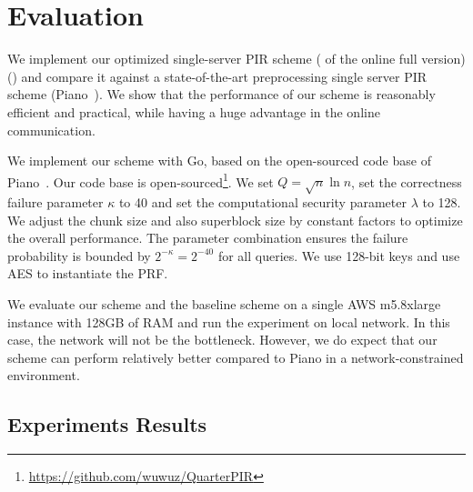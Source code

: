 

\section{Evaluation} 
\label{sec:evaluation}

We implement our optimized single-server PIR scheme 
\ifnum{}
( of the online full version)
\else
()
\fi
and compare it against a state-of-the-art preprocessing single server PIR scheme (Piano~\cite{piano}). 
We show that the performance of our scheme is reasonably efficient and practical, %
while having a huge advantage in the online communication. %

We implement our scheme with Go, based on the open-sourced code base of Piano~\cite{piano}.
Our code base is open-sourced\footnote{\url{https://github.com/wuwuz/QuarterPIR}}.
We set $Q=\sqrt{n}\ln n$, set the correctness failure parameter $\kappa$ to 40 and set the computational security parameter $\lambda$ to 128.
We adjust the chunk size and also superblock size by constant factors to optimize the overall performance.
The parameter combination ensures the failure probability is bounded by $2^{-\kappa}=2^{-40}$ for all queries.
We use 128-bit keys and use AES to instantiate the PRF.

\label{sec:setup}
We evaluate our scheme and the baseline scheme on a single AWS m5.8xlarge instance with 128GB of RAM
and run the experiment on local network.
In this case, the network will not be the bottleneck.
However, we do expect that our scheme can perform relatively better compared to Piano in a network-constrained environment.

\subsection{Experiments Results} 
\label{sec:simplepir_comparison}

